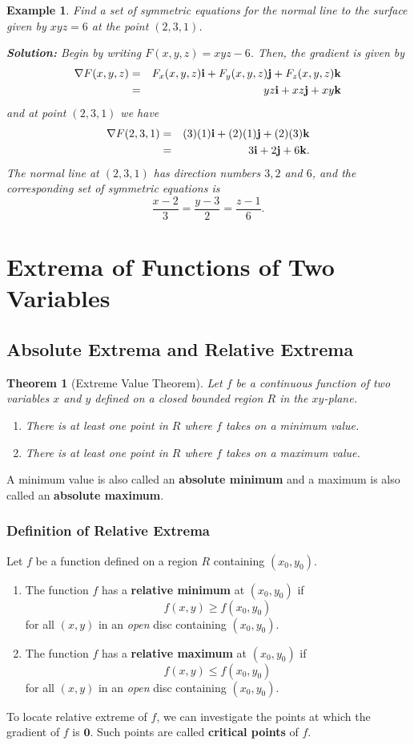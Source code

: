 \documentclass[titlepage,a4paper,12pt]{report}
\newtheorem{example}{Example}[section]
\newtheorem{theorem}{Theorem}[section]
\begin{document}
\begin{example}
Find a set of symmetric equations for the normal line to the surface given by $xyz=6$ at the point $(2,3,1)$.

\noindent \textbf{Solution:} Begin by writing $F(x,y,z)=xyz-6$. Then, the gradient is given by 
\begin{eqnarray*}
\nabla F(x,y,z) &=& F_x(x,y,z){\bf{i}} +F_y(x,y,z){\bf{j}}+F_z(x,y,z){\bf{k}}\\
&=& yz{\bf{i}} +xz{\bf{j}} +xy{\bf{k}}
\end{eqnarray*}
and at point $(2,3,1)$ we have 
\begin{eqnarray*}
\nabla F(2,3,1) &=& (3)(1){\bf{i}}+(2)(1){\bf{j}} +(2)(3){\bf{k}}\\
&=& 3{\bf{i}}+2{\bf{j}}+6{\bf{k}}.
\end{eqnarray*}
The normal line at $(2,3,1)$ has direction numbers $3,2$ and $6$, and the corresponding set of symmetric equations is 
\[\dfrac{x-2}{3}=\dfrac{y-3}{2}=\dfrac{z-1}{6}.\]
\end{example}
\section{Extrema of Functions of Two Variables}
\subsection{Absolute Extrema and Relative Extrema}
\begin{theorem}[Extreme Value Theorem]
Let $f$ be a continuous function of two variables $x$ and $y$ defined on a closed bounded region $R$ in the $xy$-plane.
\begin{enumerate}
\item There is at least one point in $R$ where $f$ takes on a minimum value.
\item There is at least one point in $R$ where $f$ takes on a maximum value.
\end{enumerate}
\end{theorem}
\noindent A minimum value is also called an \textbf{absolute minimum} and a maximum is also called an \textbf{absolute maximum}.
\subsubsection{Definition of Relative Extrema}
Let $f$ be a function defined on a region $R$ containing $(x_0,y_0)$.
\begin{enumerate}
\item The function $f$ has a \textbf{relative minimum} at $(x_0, y_0)$ if 
\[f(x,y)\geq f(x_0,y_0)\] for all $(x,y)$ in an \textit{open} disc containing $(x_0,y_0).$
\item The function $f$ has a \textbf{relative maximum} at $(x_0, y_0)$ if 
\[f(x,y)\leq f(x_0,y_0)\] for all $(x,y)$ in an \textit{open} disc containing $(x_0,y_0)$.
\end{enumerate}
To locate relative extreme of $f$, we can investigate the points at which the gradient of $f$ is $\mathbf{0}$. Such points are called \textbf{critical points} of $f$.
\end{document}
